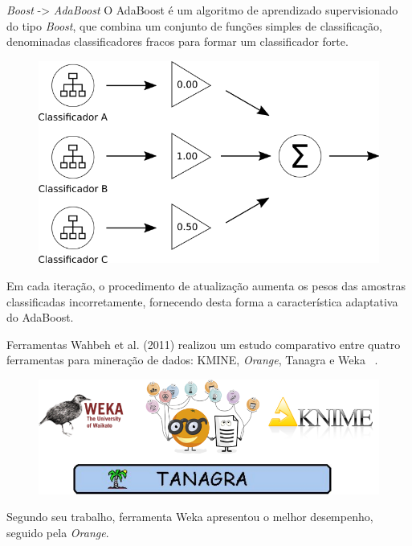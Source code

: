 \documentclass[10pt]{beamer}
\begin{document}
  \begin{frame}[fragile]{\textit{Boost} -> \textit{AdaBoost}}
    O AdaBoost é um algoritmo de aprendizado supervisionado do tipo \textit{Boost}, que combina um conjunto de funções simples de classificação, denominadas classificadores fracos para formar um classificador forte.

    \begin{figure}[H]
    \begin{center}
        \includegraphics[scale=0.35]{images/boosting.png}
    \end{center}
    \end{figure}

    Em cada iteração, o procedimento de atualização aumenta os pesos das amostras classificadas incorretamente, fornecendo desta forma a característica adaptativa do AdaBoost.

  \end{frame}

  \begin{frame}[fragile]{Ferramentas}
    Wahbeh et al. (2011) realizou um estudo comparativo entre quatro ferramentas para mineração de dados: KMINE, \textit{Orange}, Tanagra e Weka ~\cite{wahbeh2011comparison}.

    \begin{figure}[H]
    \begin{center}
        \includegraphics[scale=0.45]{images/tools_data_mining.png}
    \end{center}
    \end{figure}

    Segundo seu trabalho, ferramenta Weka apresentou o melhor desempenho, seguido pela \textit{Orange}.
  \end{frame}
\end{document}
